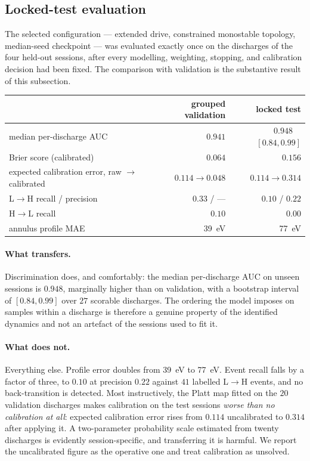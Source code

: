 \subsection{Locked-test evaluation}
\label{sec:res-test}

The selected configuration --- extended drive, constrained monostable
topology, median-seed checkpoint --- was evaluated exactly once on the
\nTest{} discharges of the four held-out sessions, after every modelling,
weighting, stopping, and calibration decision had been fixed. The
comparison with validation is the substantive result of this subsection.

\begin{center}\small
\begin{tabular}{lrr}
\toprule
& grouped validation & locked test \\
\midrule
median per-discharge AUC        & $0.941$ & $0.948$\ \ $[0.84, 0.99]$ \\
Brier score (calibrated)        & $0.064$ & $0.156$ \\
expected calibration error, raw $\to$ calibrated & $0.114 \to 0.048$ & $0.114 \to 0.314$ \\
L$\to$H recall / precision      & $0.33$ / --- & $0.10$ / $0.22$ \\
H$\to$L recall                  & $0.10$ & $0.00$ \\
annulus profile MAE             & \SI{39}{eV} & \SI{77}{eV} \\
\bottomrule
\end{tabular}
\end{center}

\paragraph{What transfers.} Discrimination does, and comfortably: the
median per-discharge AUC on unseen sessions is $0.948$, marginally higher
than on validation, with a bootstrap interval of $[0.84, 0.99]$ over $27$
scorable discharges. The ordering the model imposes on samples within a
discharge is therefore a genuine property of the identified dynamics and
not an artefact of the sessions used to fit it.

\paragraph{What does not.} Everything else. Profile error doubles from
\SI{39}{eV} to \SI{77}{eV}. Event recall falls by a factor of three, to
$0.10$ at precision $0.22$ against $41$ labelled L$\to$H events, and no
back-transition is detected. Most instructively, the Platt map fitted on the
$20$ validation discharges makes calibration on the test sessions
\emph{worse than no calibration at all}: expected calibration error rises
from $0.114$ uncalibrated to $0.314$ after applying it. A two-parameter
probability scale estimated from twenty discharges is evidently
session-specific, and transferring it is harmful. We report the
uncalibrated figure as the operative one and treat calibration as
unsolved.


